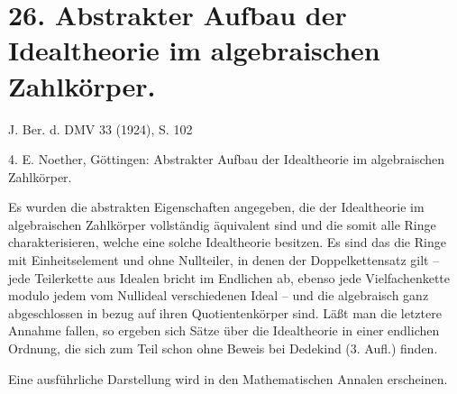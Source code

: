 \section*{26. Abstrakter Aufbau der Idealtheorie im algebraischen Zahlkörper.}

\begin{center}
J. Ber. d. DMV 33 (1924), S. 102
\end{center}

4. E. Noether, Göttingen: Abstrakter Aufbau der Idealtheorie im algebraischen Zahlkörper.

Es wurden die abstrakten Eigenschaften angegeben, die der Idealtheorie im algebraischen Zahlkörper vollständig äquivalent sind und die somit alle Ringe charakterisieren, welche eine solche Idealtheorie besitzen. Es sind das die Ringe mit Einheitselement und ohne Nullteiler, in denen der Doppelkettensatz gilt -- jede Teilerkette aus Idealen bricht im Endlichen ab, ebenso jede Vielfachenkette modulo jedem vom Nullideal verschiedenen Ideal -- und die algebraisch ganz abgeschlossen in bezug auf ihren Quotientenkörper sind. Läßt man die letztere Annahme fallen, so ergeben sich Sätze über die Idealtheorie in einer endlichen Ordnung, die sich zum Teil schon ohne Beweis bei Dedekind (3. Aufl.) finden.

Eine ausführliche Darstellung wird in den Mathematischen Annalen erscheinen.

\clearpage
